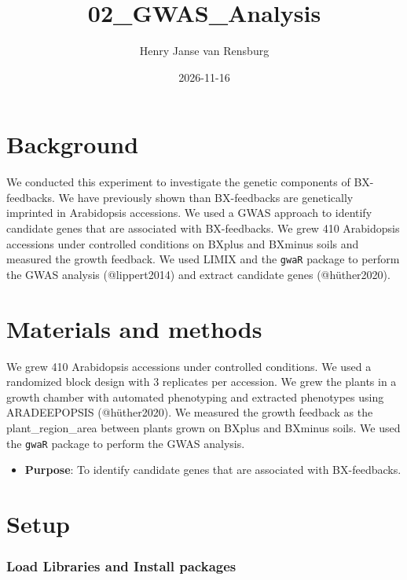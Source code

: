 \documentclass[
  11pt,
]{article}
\title{02\_GWAS\_Analysis}
\author{Henry Janse van Rensburg}
\date{2026-11-16}
\providecommand{\tightlist}{%
  \setlength{\itemsep}{0pt}\setlength{\parskip}{0pt}}\usepackage{longtable,booktabs,array}
\renewcommand*\contentsname{Table of contents}
\newcommand\contentsname{Table of contents}
\begin{document}
\maketitle

\renewcommand*\contentsname{Table of contents}
{
\hypersetup{linkcolor=}
\setcounter{tocdepth}{2}
\tableofcontents
}

\section{Background}\label{background}

We conducted this experiment to investigate the genetic components of
BX-feedbacks. We have previously shown than BX-feedbacks are genetically
imprinted in Arabidopsis accessions. We used a GWAS approach to identify
candidate genes that are associated with BX-feedbacks. We grew 410
Arabidopsis accessions under controlled conditions on BXplus and BXminus
soils and measured the growth feedback. We used LIMIX and the
\texttt{gwaR} package to perform the GWAS analysis (@lippert2014) and
extract candidate genes (@hüther2020).

\section{Materials and methods}\label{materials-and-methods}

We grew 410 Arabidopsis accessions under controlled conditions. We used
a randomized block design with 3 replicates per accession. We grew the
plants in a growth chamber with automated phenotyping and extracted
phenotypes using ARADEEPOPSIS (@hüther2020). We measured the growth
feedback as the plant\_region\_area between plants grown on BXplus and
BXminus soils. We used the \texttt{gwaR} package to perform the GWAS
analysis.

\begin{itemize}
\tightlist
\item
  \textbf{Purpose}: To identify candidate genes that are associated with
  BX-feedbacks.
\end{itemize}

\section{Setup}\label{setup}

\subsubsection{Load Libraries and Install
packages}\label{load-libraries-and-install-packages}
\end{document}
